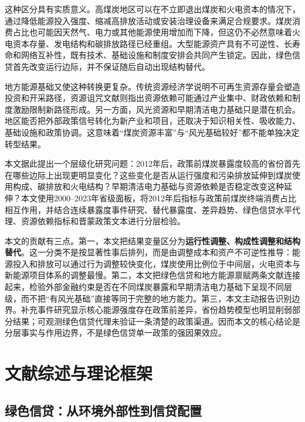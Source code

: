 \documentclass[UTF8,12pt]{ctexart}
\begin{document}
这种区分具有实质意义。高煤炭地区可以在不立即退出煤炭和火电资本的情况下，通过降低能源投入强度、缩减高排放活动或安装治理设备来满足合规要求。煤炭消费占比也可能因天然气、电力或其他能源使用增加而下降，但这仍不必然意味着火电资本存量、发电结构和碳排放路径已经重组。大型能源资产具有不可逆性、长寿命和网络互补性，既有技术、基础设施和制度安排会共同产生锁定\parencite{arthur1989,david1985,unruh2000}。因此，绿色信贷首先改变运行边际，并不保证随后自动出现结构替代。

地方能源基础又使这种转换更复杂。传统资源经济学说明不可再生资源存量会塑造投资和开采路径\parencite{hotelling1931}，资源诅咒文献则指出资源依赖可能通过产业集中、财政依赖和制度激励限制新路径形成\parencite{auty1993,sachswarner2001}。另一方面，风光资源和早期清洁电力基础只是潜在机会。地区能否把外部政策信号转化为新产业和项目，还取决于知识相关性、吸收能力、基础设施和政策协调\parencite{cohenlevinthal1990,hidalgoetal2007,neffkeetal2011,boschma2017,hansencoenen2015}。这意味着“煤炭资源丰富”与“风光基础较好”都不能单独决定转型结果。

本文据此提出一个层级化研究问题：2012年后，政策前煤炭暴露度较高的省份首先在哪些边际上出现更明显变化？这些变化是否从运行强度和污染排放延伸到煤炭使用构成、碳排放和火电结构？早期清洁电力基础与资源依赖是否稳定改变这种延伸？本文使用2000--2023年省级面板，将2012年后指标与政策前煤炭终端消费占比相互作用，并结合连续暴露度事件研究、替代暴露度、差异趋势、绿色信贷水平代理、资源依赖指标和晋蒙政策文本进行分层检验。

本文的贡献有三点。第一，本文把结果变量区分为\textbf{运行性调整、构成性调整和结构替代}。这一分类不是按显著性事后排列，而是由调整成本和资产不可逆性推导：能源投入和排放可以通过行为调整较快变化，煤炭使用比例位于中间层，火电资本与新能源项目体系的调整最慢。第二，本文把绿色信贷和地方能源禀赋两条文献连接起来，检验外部金融约束是否在不同煤炭暴露和早期清洁电力基础下呈现不同层级，而不把“有风光基础”直接等同于完整的地方能力。第三，本文主动报告识别边界。补充事件研究显示核心能源强度存在政策前差异，省份趋势模型也明显削弱部分结果；可观测绿色信贷代理未验证一条清楚的政策渠道。因而本文的核心结论是分层事实与作用边界，不是绿色信贷单一政策的强因果效应。

\section{文献综述与理论框架}

\subsection{绿色信贷：从环境外部性到信贷配置}
\end{document}
